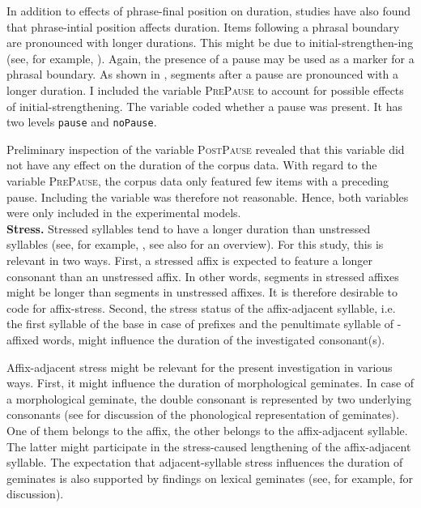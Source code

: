 In addition to effects of phrase-final position on duration, studies have also found that phrase-intial position affects duration. Items following a phrasal boundary are pronounced with longer durations. This might be due to initial-strengthen-ing (see, for example, \citealt{Cho.2001b,Byrd.2006,Cho.2007}). Again, the presence of a pause may be used as a marker for a phrasal boundary. As shown in \cite{Umeda.1977}, segments after a pause are pronounced with a longer duration. 
I included the variable \textsc{PrePause} to account for possible effects of initial-strengthening. The variable coded whether a pause was present. It has two levels \texttt{pause} and \texttt{noPause}. 

Preliminary inspection of the variable \textsc{PostPause} revealed that this variable did not have any effect on the duration of the corpus data. With regard to the variable \textsc{PrePause}, the corpus data only featured few items with a preceding pause.  Including the variable was therefore not reasonable. Hence, both variables were only included in the experimental models. \\

\textbf{Stress.} \label{stress coding} Stressed syllables tend to have a longer duration than unstressed syllables (see, for example, \citealt{Fry.1955, Fry.1958, Lieberman.1960, Beckman.1986, Eriksson.2016}, see also \citealt{Laver.1994} for an overview). For this study, this is relevant in two ways.  First, a stressed affix is expected to feature a longer consonant than an unstressed affix. In other words, segments in stressed affixes might be longer than segments in unstressed affixes. It is therefore desirable to code for affix-stress.
Second, the stress status of the affix-adjacent syllable, i.e. the first syllable of the base in case of prefixes and the penultimate syllable of -affixed words, might influence the duration of the investigated consonant(s). 

Affix-adjacent stress might be relevant  for the present investigation in various ways. First, it might influence the duration of morphological geminates. In case of a morphological geminate, the double consonant is represented by two underlying consonants (see  for discussion of the phonological representation of geminates). One of them belongs to the affix, the other belongs to the affix-adjacent syllable. The latter might participate in the stress-caused lengthening of the affix-adjacent syllable.  The expectation that adjacent-syllable stress influences the duration of geminates is also supported by findings on lexical geminates (see, for example, \citealt{Dmitrieva.2017} for discussion).

